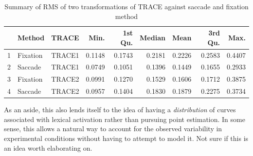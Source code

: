 \documentclass{article}
\begin{document}
\begin{table}[ht]
\centering
\begin{tabular}{rllrrrrrr}
  \hline
 & Method & TRACE & Min. & 1st Qu. & Median & Mean & 3rd Qu. & Max. \\ 
  \hline
1 & Fixation & TRACE1 & 0.1148 & 0.1743 & 0.2181 & 0.2226 & 0.2583 & 0.4407 \\ 
  2 & Saccade & TRACE1 & 0.0749 & 0.1051 & 0.1396 & 0.1449 & 0.1655 & 0.2933 \\ \hline
  3 & Fixation & TRACE2 & 0.0991 & 0.1270 & 0.1529 & 0.1606 & 0.1712 & 0.3875 \\ 
  4 & Saccade & TRACE2 & 0.0957 & 0.1404 & 0.1830 & 0.1879 & 0.2275 & 0.3734 \\ 
   \hline
\end{tabular}
\caption{Summary of RMS of two transformations of TRACE against saccade and fixation method}
\label{tab:mise_trace}
\end{table}

As an aside, this also lends itself to the idea of having a \textit{distribution} of curves associated with lexical activation rather than pursuing point estimation.  In some sense, this allows a natural way to account for the observed variability in experimental conditions without having to attempt to model it. Not sure if this is an idea worth elaborating on.
\end{document}
